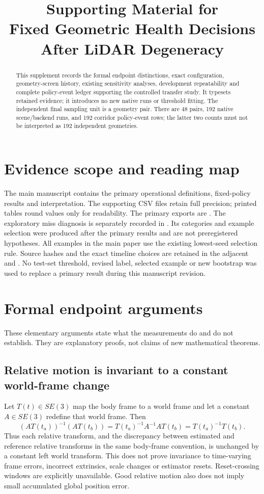 \documentclass[conference,onecolumn]{IEEEtran}
\title{Supporting Material for\\Fixed Geometric Health Decisions After LiDAR Degeneracy}
\author{\IEEEauthorblockN{Harshil Patel, Daksha Lingampeta, and Nisarg Vyas}}
\begin{document}
\maketitle
\begin{abstract}
This supplement records the formal endpoint distinctions, exact configuration,
geometry-screen history, existing sensitivity analyses, development repeatability
and complete policy-event ledger supporting the controlled transfer study.
It typesets retained evidence; it introduces no new native runs or threshold fitting.
The independent final sampling unit is a geometry pair. There are 48 pairs,
192 native scene/backend runs, and 192 corridor policy-event rows; the latter
two counts must not be interpreted as 192 independent geometries.
\end{abstract}

\section{Evidence scope and reading map}
The main manuscript contains the primary operational definitions, fixed-policy
results and interpretation. The supporting CSV files retain full precision;
printed tables round values only for readability. The primary exports are
.
The exploratory miss diagnosis is separately recorded in
. Its categories and example selection
were produced after the primary results and are not preregistered hypotheses.
All examples in the main paper use the existing lowest-seed selection rule.
Source hashes and the exact timeline choices are retained in the adjacent
 and .
No test-set threshold, revised label, selected example or new bootstrap was
used to replace a primary result during this manuscript revision.

\section{Formal endpoint arguments}
These elementary arguments state what the measurements do and do not establish.
They are explanatory proofs, not claims of new mathematical theorems.

\subsection{Relative motion is invariant to a constant world-frame change}
Let $T(t)\in SE(3)$ map the body frame to a world frame and let a constant
$A\in SE(3)$ redefine that world frame. Then
\begin{equation}
(AT(t_a))^{-1}(AT(t_b))=T(t_a)^{-1}A^{-1}AT(t_b)
=T(t_a)^{-1}T(t_b).
\end{equation}
Thus each relative transform, and the discrepancy between estimated and reference
relative transforms in the same body-frame convention, is unchanged by a constant
left world transform. This does not prove invariance to time-varying frame errors,
incorrect extrinsics, scale changes or estimator resets. Reset-crossing windows
are explicitly unavailable. Good relative motion also does not imply small
accumulated global position error.
\end{document}

